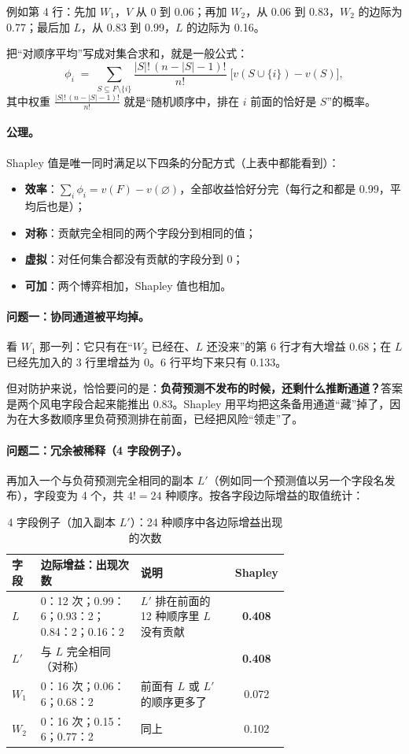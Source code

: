 \documentclass[zihao=-4,a4paper]{ctexart}
\begin{document}
例如第 4 行：先加 $W_1$，$V$ 从 0 到 0.06；再加 $W_2$，从 0.06 到 0.83，$W_2$ 的边际为 0.77；最后加 $L$，从 0.83 到 0.99，$L$ 的边际为 0.16。

把“对顺序平均”写成对集合求和，就是一般公式：
\[
  \phi_i \;=\; \sum_{S\subseteq F\setminus\{i\}} \frac{|S|!\,(n-|S|-1)!}{n!}\;\big[v(S\cup\{i\})-v(S)\big],
\]
其中权重 $\frac{|S|!\,(n-|S|-1)!}{n!}$ 就是“随机顺序中，排在 $i$ 前面的恰好是 $S$”的概率。

\paragraph{公理。}Shapley 值是唯一同时满足以下四条的分配方式（上表中都能看到）：
\begin{itemize}[leftmargin=*]
  \item \textbf{效率}：$\sum_i \phi_i = v(F)-v(\varnothing)$，全部收益恰好分完（每行之和都是 0.99，平均后也是）；
  \item \textbf{对称}：贡献完全相同的两个字段分到相同的值；
  \item \textbf{虚拟}：对任何集合都没有贡献的字段分到 0；
  \item \textbf{可加}：两个博弈相加，Shapley 值也相加。
\end{itemize}

\paragraph{问题一：协同通道被平均掉。}看 $W_1$ 那一列：它只有在“$W_2$ 已经在、$L$ 还没来”的第 6 行才有大增益 0.68；在 $L$ 已经先加入的 3 行里增益为 0。6 行平均下来只有 0.133。

但对防护来说，恰恰要问的是：\textbf{负荷预测不发布的时候，还剩什么推断通道？}答案是两个风电字段合起来能推出 0.83。Shapley 用平均把这条备用通道“藏”掉了，因为在大多数顺序里负荷预测排在前面，已经把风险“领走”了。

\paragraph{问题二：冗余被稀释（4 字段例子）。}再加入一个与负荷预测完全相同的副本 $L'$（例如同一个预测值以另一个字段名发布），字段变为 4 个，共 $4!=24$ 种顺序。按各字段边际增益的取值统计：

\begin{table}[H]\centering
\caption{4 字段例子（加入副本 $L'$）：24 种顺序中各边际增益出现的次数}
\footnotesize
\begin{tabular}{lp{0.36\linewidth}p{0.34\linewidth}c}
\toprule
字段 & 边际增益：出现次数 & 说明 & Shapley \\
\midrule
$L$ & 0：12 次；0.99：6；0.93：2；0.84：2；0.16：2 & $L'$ 排在前面的 12 种顺序里 $L$ 没有贡献 & \textbf{0.408} \\
$L'$ & 与 $L$ 完全相同（对称） & & \textbf{0.408} \\
$W_1$ & 0：16 次；0.06：6；0.68：2 & 前面有 $L$ 或 $L'$ 的顺序更多了 & 0.072 \\
$W_2$ & 0：16 次；0.15：6；0.77：2 & 同上 & 0.102 \\
\bottomrule
\end{tabular}
\end{table}
\end{document}
